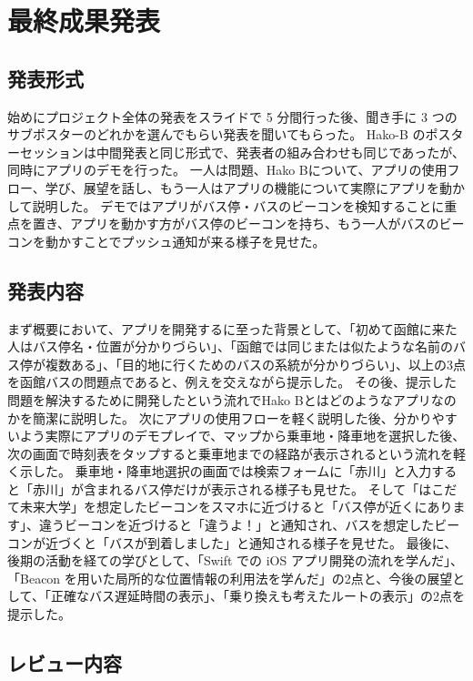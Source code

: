 \documentclass[openany,11pt,papersize]{jsbook}
\begin{document}

\section{最終成果発表}
\subsection{発表形式}
始めにプロジェクト全体の発表をスライドで 5 分間行った後、聞き手に 3 つのサブポスターのどれかを選んでもらい発表を聞いてもらった。
Hako-B のポスターセッションは中間発表と同じ形式で、発表者の組み合わせも同じであったが、同時にアプリのデモを行った。
一人は問題、Hako Bについて、アプリの使用フロー、学び、展望を話し、もう一人はアプリの機能について実際にアプリを動かして説明した。
デモではアプリがバス停・バスのビーコンを検知することに重点を置き、アプリを動かす方がバス停のビーコンを持ち、もう一人がバスのビーコンを動かすことでプッシュ通知が来る様子を見せた。


\subsection{発表内容}
まず概要において、アプリを開発するに至った背景として、「初めて函館に来た人はバス停名・位置が分かりづらい」、「函館では同じまたは似たような名前のバス停が複数ある」、「目的地に行くためのバスの系統が分かりづらい」、以上の3点を函館バスの問題点であると、例えを交えながら提示した。
その後、提示した問題を解決するために開発したという流れでHako Bとはどのようなアプリなのかを簡潔に説明した。
次にアプリの使用フローを軽く説明した後、分かりやすいよう実際にアプリのデモプレイで、マップから乗車地・降車地を選択した後、次の画面で時刻表をタップすると乗車地までの経路が表示されるという流れを軽く示した。
乗車地・降車地選択の画面では検索フォームに「赤川」と入力すると「赤川」が含まれるバス停だけが表示される様子も見せた。
そして「はこだて未来大学」を想定したビーコンをスマホに近づけると「バス停が近くにあります」、違うビーコンを近づけると「違うよ！」と通知され、バスを想定したビーコンが近づくと「バスが到着しました」と通知される様子を見せた。
最後に、後期の活動を経ての学びとして、「Swift での iOS アプリ開発の流れを学んだ」、「Beacon を用いた局所的な位置情報の利用法を学んだ」の2点と、今後の展望として、「正確なバス遅延時間の表示」、「乗り換えも考えたルートの表示」の2点を提示した。


\subsection{レビュー内容}
\end{document}
